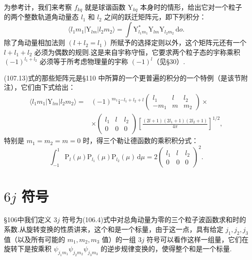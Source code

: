 为参考计，我们来考察 $f_{kq}$ 就是球谐函数 $\mathrm{Y}_{kq}$ 本身时的情形，给出它对一个粒子的两个整数轨道角动量态 $l_1$ 和 $l_2$ 之间的跃迁矩阵元，即下列积分：
\begin{equation}
  \langle l_1m_1|\mathrm{Y}_{lm}|l_2m_2\rangle
  =\int \mathrm{Y}^{*}_{l_1m_1}\mathrm{Y}_{lm}\mathrm{Y}_{l_2m_2}\,\mathrm{d}o.
\end{equation}
除了角动量相加法则 $(l+l_2=l_1)$ 所赋予的选择定则以外，这个矩阵元还有一个 $l+l_1+l_2$ 必须为偶数的规则.这是来自宇称守恒，它要求两个粒子态的宇称乘积 $(-1)^{l_1+l_2}$ 必须等于所考虑物理量的宇称 $(-1)^l$（见§30）.

(107.13)式的那些矩阵元是§110 中所算的一个更普遍的积分的一个特例（是该节附注），它们由下式给出：
\begin{equation}
\begin{aligned}
  \langle l_1m_1|\mathrm{Y}_{lm}|l_2m_2\rangle
  ={}&(-1)^{m_1}\mathrm{i}^{-l_1+l_2+l}
  \left(\begin{array}{ccc}l_1&l&l_2\\-m_1&m&m_2\end{array}\right)\times\\
  &\times\left(\begin{array}{ccc}l_1&l&l_2\\0&0&0\end{array}\right)
  \left[\frac{(2l+1)(2l_1+1)(2l_2+1)}{4\pi}\right]^{1/2},
\end{aligned}
\end{equation}
特别是 $m_1=m_2=m=0$ 时，得三个勒让德函数的乘积积分式：
\begin{equation}
  \int_{-1}^{1}\mathrm{P}_l(\mu)\mathrm{P}_{l_1}(\mu)\mathrm{P}_{l_2}(\mu)\,\mathrm{d}\mu
  =2\left(\begin{array}{ccc}l_1&l&l_2\\0&0&0\end{array}\right)^{\!2}.
\end{equation}

\section{\texorpdfstring{$6j$}{6j} 符号}

§106中我们定义 $3j$ 符号为(106.4)式中对总角动量为零的三个粒子波函数求和时的系数.从旋转变换的性质讲来，这个和是一个标量，由于这一点，具有给定 $j_1,j_2,j_3$ 值（以及所有可能的 $m_1,m_2,m_3$ 值）的一组 $3j$ 符号可以看作这样一组量，它们在旋转下是按乘积 $\psi_{j_1m_1}\psi_{j_2m_2}\psi_{j_3m_3}$ 的逆步规律变换的，使得整个和是一个标量.


